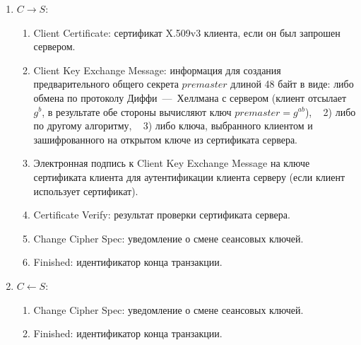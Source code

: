 \begin{enumerate}
    \item $C \rightarrow S$:
        \begin{enumerate}
            \item Client Certificate: сертификат X.509v3 клиента, если он был запрошен сервером.
            \item Client Key Exchange Message: информация для создания предварительного общего секрета $premaster$ длиной 48 байт в виде: либо обмена по протоколу Диффи~---~Хеллмана с сервером (клиент отсылает $g^b$, в результате обе стороны вычисляют ключ $premaster = g^{ab}$), ~ 2) либо по другому алгоритму, ~ 3) либо ключа, выбранного клиентом и зашифрованного на открытом ключе из сертификата сервера.
            \item Электронная подпись к Client Key Exchange Message на ключе сертификата клиента для аутентификации клиента серверу (если клиент использует сертификат).
            \item Certificate Verify: результат проверки сертификата сервера.
            \item Change Cipher Spec: уведомление о смене сеансовых ключей.
            \item Finished: идентификатор конца транзакции.
        \end{enumerate}

    \item $C \leftarrow S$:
        \begin{enumerate}
            \item Change Cipher Spec: уведомление о смене сеансовых ключей.
            \item Finished: идентификатор конца транзакции.
        \end{enumerate}
\end{enumerate}




